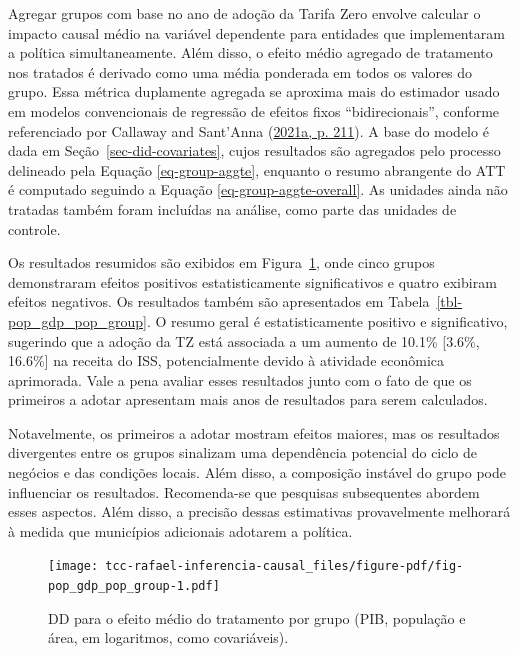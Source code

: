 \documentclass[12pt, a4paper, twoside]{article}
\numberwithin{equation}{subsection} %
\begin{document}
Agregar grupos com base no ano de adoção da Tarifa Zero envolve calcular
o impacto causal médio na variável dependente para entidades que
implementaram a política simultaneamente. Além disso, o efeito médio
agregado de tratamento nos tratados é derivado como uma média ponderada
em todos os valores do grupo. Essa métrica duplamente agregada se
aproxima mais do estimador usado em modelos convencionais de regressão
de efeitos fixos ``bidirecionais'', conforme referenciado por Callaway
and Sant'Anna (\protect\hyperlink{ref-CALLAWAY2021200}{2021a, p. 211}).
A base do modelo é dada em Seção~\ref{sec-did-covariates}, cujos
resultados são agregados pelo processo delineado pela Equação
\eqref{eq-group-aggte}, enquanto o resumo abrangente do ATT é computado
seguindo a Equação \eqref{eq-group-aggte-overall}. As unidades ainda não
tratadas também foram incluídas na análise, como parte das unidades de
controle.

Os resultados resumidos são exibidos em
Figura~\ref{fig-pop_gdp_pop_group}, onde cinco grupos demonstraram
efeitos positivos estatisticamente significativos e quatro exibiram
efeitos negativos. Os resultados também são apresentados em
Tabela~\ref{tbl-pop_gdp_pop_group}. O resumo geral é estatisticamente
positivo e significativo, sugerindo que a adoção da TZ está associada a
um aumento de 10.1\% {[}3.6\%, 16.6\%{]} na receita do ISS,
potencialmente devido à atividade econômica aprimorada. Vale a pena
avaliar esses resultados junto com o fato de que os primeiros a adotar
apresentam mais anos de resultados para serem calculados.

Notavelmente, os primeiros a adotar mostram efeitos maiores, mas os
resultados divergentes entre os grupos sinalizam uma dependência
potencial do ciclo de negócios e das condições locais. Além disso, a
composição instável do grupo pode influenciar os resultados.
Recomenda-se que pesquisas subsequentes abordem esses aspectos. Além
disso, a precisão dessas estimativas provavelmente melhorará à medida
que municípios adicionais adotarem a política.

\begin{figure}[H]

{\centering \texttt{[image: tcc-rafael-inferencia-causal\_files/figure-pdf/fig-pop\_gdp\_pop\_group-1.pdf]}

}

\caption{\label{fig-pop_gdp_pop_group}DD para o efeito médio do
tratamento por grupo (PIB, população e área, em logaritmos, como
covariáveis).}

\end{figure}
\end{document}
